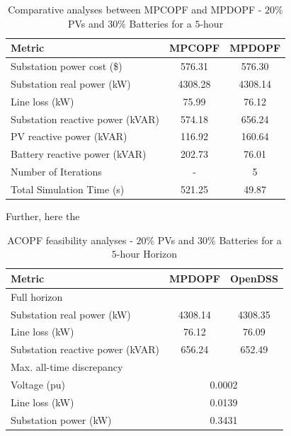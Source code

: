 \documentclass[../../outputs/main.tex]{subfiles}
\begin{document}
\begin{table}[h!]
    \centering
    \caption{Comparative analyses between MPCOPF and MPDOPF - $20 \%$ PVs and $30 \%$ Batteries for a $5$-hour}
    \begin{tabular}{|l|c|c|}
    \hline
    \textbf{Metric} & \textbf{MPCOPF} & \textbf{MPDOPF} \\ \hline
    Substation power cost (\$) & 576.31 & 576.30 \\ \hline
    Substation real power (kW) & 4308.28 & 4308.14 \\ \hline
    Line loss (kW) & 75.99 & 76.12 \\ \hline
    Substation reactive power (kVAR) & 574.18 & 656.24 \\ \hline
    PV reactive power (kVAR) & 116.92 & 160.64 \\ \hline
    Battery reactive power (kVAR) & 202.73 & 76.01 \\ \hline
    Number of Iterations & - & 5 \\ \hline
    Total Simulation Time (s) & 521.25 & 49.87 \\ \hline
    \end{tabular}
    \label{table:opt-5-20-30}
\end{table}


Further, here the 

\begin{table}[h!]
    \centering
    \caption{ACOPF feasibility analyses - $20 \%$ PVs and $30 \%$ Batteries for a $5$-hour Horizon}
    \begin{tabular}{|l|c|c|}
    \hline
    \textbf{Metric} & \textbf{MPDOPF} & \textbf{OpenDSS} \\ \hline
    Full horizon  & \multicolumn{2}{c|}{} \\ \hline
    \quad Substation real power (kW) & 4308.14 & 4308.35 \\ \hline
    \quad Line loss (kW) & 76.12 & 76.09 \\ \hline
    \quad Substation reactive power (kVAR) & 656.24 & 652.49 \\ \hline
    Max. all-time discrepancy & \multicolumn{2}{c|}{} \\ \hline
    \quad Voltage (pu) & \multicolumn{2}{c|}{0.0002} \\ \hline
    \quad Line loss (kW) & \multicolumn{2}{c|}{0.0139} \\ \hline
    \quad Substation power (kW) & \multicolumn{2}{c|}{0.3431} \\ \hline
    \end{tabular}
    \label{table:feas-5-20-30}
\end{table}
\end{document}
